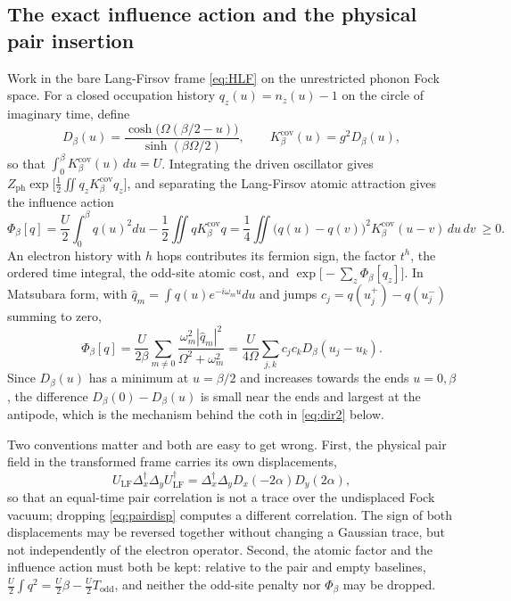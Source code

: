 \documentclass[11pt]{article}
\theoremstyle{definition}
\theoremstyle{remark}
\newcommand{\Dop}{\Delta}
\newcommand{\LF}{\mathrm{LF}}
\begin{document}
\subsection{The exact influence action and the physical pair insertion}

Work in the bare Lang-Firsov frame \eqref{eq:HLF} on the unrestricted phonon Fock
space. For a closed occupation history $q_{z}(u)=n_{z}(u)-1$ on the circle of
imaginary time, define
\begin{equation}
D_{\beta}(u)=\frac{\cosh\bigl(\Omega(\beta/2-u)\bigr)}{\sinh(\beta\Omega/2)},
\qquad K_{\beta}^{\mathrm{cov}}(u)=g^{2}D_{\beta}(u),
\label{eq:Db}
\end{equation}
so that $\int_{0}^{\beta}K_{\beta}^{\mathrm{cov}}(u)\,du=U$. Integrating the
driven oscillator gives
$Z_{\mathrm{ph}}\exp\bigl[\tfrac12\iint q_{z}K_{\beta}^{\mathrm{cov}}q_{z}\bigr]$,
and separating the Lang-Firsov atomic attraction gives the influence action
\begin{equation}
\Phi_{\beta}[q]=\frac U2\int_0^{\beta}q(u)^{2}du-\frac12\iint q K_{\beta}^{\mathrm{cov}}q
=\frac14\iint\bigl(q(u)-q(v)\bigr)^{2}K_{\beta}^{\mathrm{cov}}(u-v)\,du\,dv\ \ge0 .
\label{eq:Phi}
\end{equation}
An electron history with $h$ hops contributes its fermion sign, the factor
$t^{h}$, the ordered time integral, the odd-site atomic cost, and
$\exp\bigl[-\sum_{z}\Phi_{\beta}[q_{z}]\bigr]$. In Matsubara form, with
$\widehat q_{m}=\int q(u)e^{-i\omega_{m}u}du$ and jumps
$c_{j}=q(u_{j}^{+})-q(u_{j}^{-})$ summing to zero,
\begin{equation}
\Phi_{\beta}[q]=\frac{U}{2\beta}\sum_{m\ne0}\frac{\omega_{m}^{2}|\widehat q_{m}|^{2}}
{\Omega^{2}+\omega_{m}^{2}}
=\frac{U}{4\Omega}\sum_{j,k}c_{j}c_{k}D_{\beta}(u_{j}-u_{k}).
\label{eq:Phimodes}
\end{equation}
Since $D_{\beta}(u)$ has a minimum at $u=\beta/2$ and increases towards the
ends $u=0,\beta$, the difference $D_{\beta}(0)-D_{\beta}(u)$ is small near the
ends and largest at the antipode, which is the mechanism behind the coth in
\eqref{eq:dir2} below.

Two conventions matter and both are easy to get wrong. First, the physical pair
field in the transformed frame carries its own displacements,
\begin{equation}
U_{\LF}\Dop_{x}^{\dagger}\Dop_{y}U_{\LF}^{\dagger}
=\Dop_{x}^{\dagger}\Dop_{y}D_{x}(-2\alpha)D_{y}(2\alpha),
\label{eq:pairdisp}
\end{equation}
so that an equal-time pair correlation is not a trace over the undisplaced
Fock vacuum; dropping \eqref{eq:pairdisp} computes a different correlation. The
sign of both displacements may be reversed together without changing a Gaussian
trace, but not independently of the electron operator. Second, the atomic factor
and the influence action must both be kept: relative to the pair and empty
baselines, $\tfrac U2\int q^{2}=\tfrac U2\beta-\tfrac U2T_{\mathrm{odd}}$, and
neither the odd-site penalty nor $\Phi_{\beta}$ may be dropped.
\end{document}
